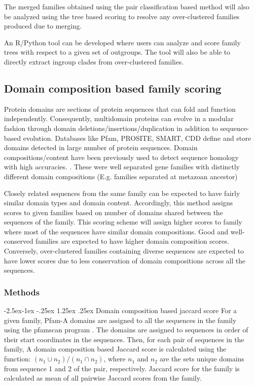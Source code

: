 \documentclass{article}
\makeatletter
\renewcommand\paragraph{\@startsection{paragraph}{4}{\z@}%
	{-2.5ex\@plus -1ex \@minus -.25ex}%
	{1.25ex \@plus .25ex}%
	{\normalfont\normalsize\bfseries}}
\makeatother
\begin{document}
		The merged families obtained using the pair classification based method will also be analyzed using the tree based scoring to resolve any over-clustered families produced due to merging.
		
		An R/Python tool can be developed where users can analyze and score family trees with respect to a given set of outgroups. The tool will also be able to directly extract ingroup clades from over-clustered families.
		\pagebreak
		
	\subsection{Domain composition based family scoring}
	Protein domains are sections of protein sequences that can fold and function independently. Consequently, multidomain proteins can evolve in a modular fashion through domain deletions/insertions/duplication in addition to sequence-based evolution. Databases like Pfam, PROSITE, SMART, CDD \citep{finn2007pfam,falquet2002prosite,letunic2011smart,marchler2010cdd} define and store domains detected in large number of protein sequences. Domain compositions/content have been previously used to detect sequence homology with high accuracies. \citep{song2007domain,bitard2015domain}. These were well separated gene families with distinctly different domain compositions (E.g. families separated at metazoan ancestor)
	
	Closely related sequences from the same family can be expected to have fairly similar domain types and domain content. Accordingly, this method assigns scores to given families based on number of domains shared between the sequences of the family. This scoring scheme will assign higher scores to family where most of the sequences have similar domain compositions. Good and well-conserved families are expected to have higher domain composition scores. Conversely, over-clustered families containing diverse sequences are expected to have lower scores due to less conservation of domain compositions across all the sequences.
	
	\subsubsection{Methods}
		\paragraph{Domain composition based jaccard score}
		For a given family, Pfam-A domains are assigned to all the sequences in the family using the pfamscan program \citep{mistry2007predicting}. The domains are assigned  to sequences in order of their start coordinates in the sequences. Then, for each pair of sequences in the family, A domain composition based Jaccard score is calculated using the function: $(n_1 \cup  n_2)/(n_1 \cap n_2)$, where $n_1$ and $n_2$ are the sets unique domains from sequence 1 and 2 of the pair, respectively. Jaccard score for the family is calculated as mean of all pairwise Jaccard scores from the family.
		
\end{document}
